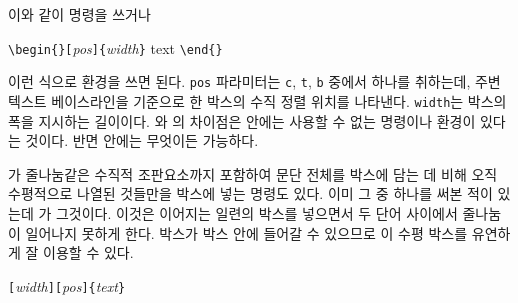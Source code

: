 \noindent 이와 같이  명령을 쓰거나

\begin{lscommand}
\verb|\begin{|\verb|}[|\emph{pos}\verb|]{|\emph{width}\verb|}| text
\verb|\end{|\verb|}|
\end{lscommand}

\noindent 이런 식으로  환경을 쓰면 된다.
\texttt{pos} 파라미터는 \texttt{c}, \texttt{t}, \texttt{b} 중에서 하나를 취하는데, 주변 텍스트 베이스라인을 기준으로 한 박스의 수직 정렬 위치를 나타낸다.
\texttt{width}는 박스의 폭을 지시하는 길이이다. 
와 의 차이점은  안에는 사용할 수 없는 명령이나 환경이 있다는 것이다. 반면  안에는 무엇이든 가능하다.

가 줄나눔같은 수직적 조판요소까지 포함하여 문단 전체를 박스에 담는 데 비해 오직 수평적으로 나열된 것들만을 박스에 넣는 명령도 있다. 이미 그 중 하나를 써본 적이 있는데 가 그것이다. 이것은 이어지는 일련의 박스를 넣으면서 두 단어 사이에서 줄나눔이 일어나지 못하게 한다. 박스가 박스 안에 들어갈 수 있으므로 이 수평 박스를 유연하게 잘 이용할 수 있다.

\begin{lscommand}
\verb|[|\emph{width}\verb|][|\emph{pos}\verb|]{|\emph{text}\verb|}|
\end{lscommand}

